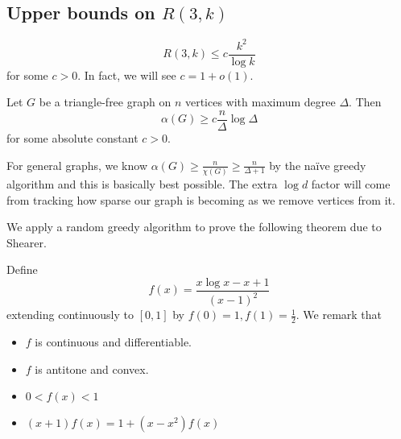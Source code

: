 \documentclass{article}
\begin{document}
\clearpage

\subsection{Upper bounds on \texorpdfstring{$R(3, k)$}{R(3, k)}}

\newlec

\begin{thm}
  $$R(3, k) \le c \frac{k^2}{\log k}$$
  for some $c > 0$. In fact, we will see $c = 1 + o(1)$.
\end{thm}

\begin{thm}
  Let $G$ be a triangle-free graph on $n$ vertices with maximum degree $\Delta$. Then
  $$\alpha(G) \ge c \frac n\Delta \log\Delta$$
  for some absolute constant $c > 0$.
\end{thm}

\begin{rmk}
  For general graphs, we know $\alpha(G) \ge \frac n{\chi(G)} \ge \frac n{\Delta + 1}$ by the naïve greedy algorithm and this is basically best possible. The extra $\log d$ factor will come from tracking how sparse our graph is becoming as we remove vertices from it.
\end{rmk}

We apply a random greedy algorithm to prove the following theorem due to Shearer.

Define
$$f(x) = \frac{x \log x - x + 1}{(x - 1)^2}$$
extending continuously to $[0, 1]$ by $f(0) = 1, f(1) = \frac 12$. We remark that
\begin{itemize}
  \item $f$ is continuous and differentiable.
  \item $f$ is antitone and convex.
  \item $0 < f(x) < 1$
  \item $(x + 1)f(x) = 1 + (x - x^2)f(x)$
\end{itemize}
\end{document}
